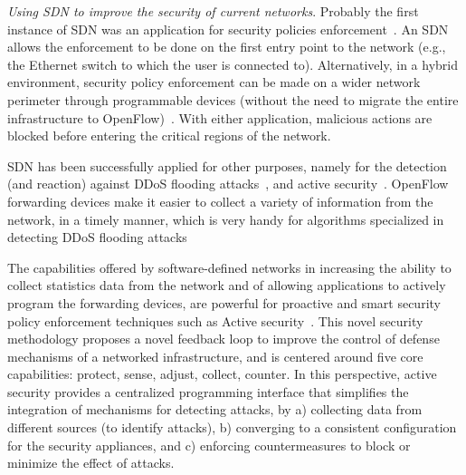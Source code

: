 %

\noindent \textit{Using SDN to improve the security of current networks}.
Probably the first instance of SDN was an application for security policies enforcement~\cite{casado2006}. 
An SDN allows the enforcement to be done on the first entry point to the network (e.g., the Ethernet switch to which the user is connected to). 
Alternatively, in a hybrid environment, security policy enforcement can be made on a wider network perimeter through programmable devices (without the need to migrate the entire infrastructure to OpenFlow)~\cite{wang2012-1}.
With either application, malicious actions are blocked before entering the critical regions of the network.

SDN has been successfully applied for other purposes, namely for the detection (and reaction) against DDoS flooding attacks~\cite{braga2010-1}, and active security~\cite{hand2013}.
OpenFlow forwarding devices make it easier to collect a variety of information from the network, in a timely 
manner, which is very handy for algorithms specialized in detecting DDoS flooding attacks

The capabilities offered by software-defined networks in increasing the ability to collect statistics data from the network and of allowing applications to actively program the forwarding devices, are powerful for proactive and smart 
security policy enforcement techniques such as Active security~\cite{hand2013}.
This novel security methodology proposes a novel feedback loop to improve the control of defense mechanisms 
of a networked infrastructure, and is centered around five core capabilities: protect, sense, 
adjust, collect, counter.
In this perspective, active security provides a centralized programming interface that simplifies the integration of mechanisms for detecting attacks, by
a) collecting data from different sources (to identify attacks), 
b) converging to a consistent configuration for the security appliances, and 
c) enforcing countermeasures to block or minimize the effect of attacks.

